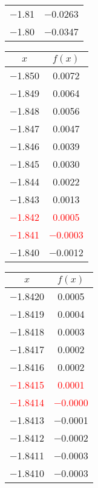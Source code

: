 \documentclass{article}
\begin{document}
\begin{enumerate}
\begin{enumerate}
\begin{tabular}{|c|c|}
            \num{-1,81} & \num{-0,0263} \\
            \num{-1,80} & \num{-0,0347} \\
            \hline
            \end{tabular}\quad
            \begin{tabular}{|c|c|}
            \hline
            $x$   & $f(x)$ \\
            \hline
            \num{-1,850} & \num{0,0072} \\
            \num{-1,849} & \num{0,0064} \\
            \num{-1,848} & \num{0,0056} \\
            \num{-1,847} & \num{0,0047} \\
            \num{-1,846} & \num{0,0039} \\
            \num{-1,845} & \num{0,0030} \\
            \num{-1,844} & \num{0,0022} \\
            \num{-1,843} & \num{0,0013} \\
            \textcolor{red}{\num{-1,842}} & \textcolor{red}{\num{0,0005}} \\
            \textcolor{red}{\num{-1,841}} & \textcolor{red}{\num{-0,0003}} \\
            \num{-1,840} & \num{-0,0012} \\
            \hline
            \end{tabular}\quad
            \begin{tabular}{|c|c|}
            \hline
            $x$   & $f(x)$ \\
            \hline
            \num{-1,8420} & \num{0,0005} \\
            \num{-1,8419} & \num{0,0004} \\
            \num{-1,8418} & \num{0,0003} \\
            \num{-1,8417} & \num{0,0002} \\
            \num{-1,8416} & \num{0,0002} \\
            \textcolor{red}{\num{-1,8415}} & \textcolor{red}{\num{0,0001}} \\
            \textcolor{red}{\num{-1,8414}} & \textcolor{red}{\num{-0,0000}} \\
            \num{-1,8413} & \num{-0,0001} \\
            \num{-1,8412} & \num{-0,0002} \\
            \num{-1,8411} & \num{-0,0003} \\
            \num{-1,8410} & \num{-0,0003} \\
            \hline
            \end{tabular}\quad \\
    

\end{enumerate}
\end{enumerate}
\end{document}
